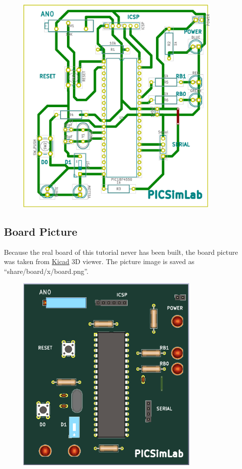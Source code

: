 \begin{figure}[H]
\center
\includegraphics[width=0.9\textwidth, angle=-90]{board_x/board_x_pcb.eps} 
\end{figure} 

\pagebreak
\subsection{Board Picture}


Because the real board of this tutorial never has been built, the board picture was taken from \href{http://kicad-pcb.org/}{Kicad} 3D viewer.
The picture image is saved as ``share/board/x/board.png''.

\begin{figure}[H]
\center
\includegraphics[width=0.8\textwidth]{files/share/board.png} 
\end{figure} 

